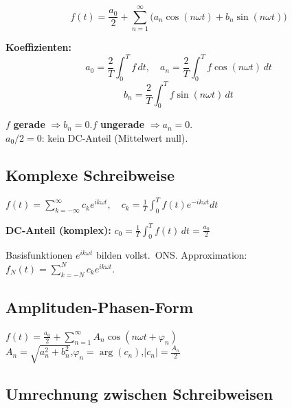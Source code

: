 \documentclass[10pt,a4paper,twocolumn]{article}
\newcommand{\detail}[1]{{\small\color{detail}#1}}
\begin{document}
	\begin{tcolorbox}[defbox, title={Formel}]
		$$f(t)=\frac{a_0}{2}+\sum_{n=1}^\infty\bigl(a_n\cos(n\omega t)+b_n\sin(n\omega t)\bigr)$$
	\end{tcolorbox}
	
	\textbf{Koeffizienten:}
	$$a_0=\frac{2}{T}\int_0^T\!f\,dt, \quad a_n=\frac{2}{T}\int_0^T\!f\cos(n\omega t)\,dt$$
	$$b_n=\frac{2}{T}\int_0^T\!f\sin(n\omega t)\,dt$$
	
	\begin{tcolorbox}[tipbox]
		$f$ \textbf{gerade} $\Rightarrow b_n=0$.\quad $f$ \textbf{ungerade} $\Rightarrow a_n=0$.\\
		$a_0/2=0$: kein DC-Anteil (Mittelwert null).
	\end{tcolorbox}
	
	\subsection{Komplexe Schreibweise}
	
	\begin{tcolorbox}[defbox, title={Formel}]
		$f(t)=\sum_{k=-\infty}^{\infty}c_k e^{ik\omega t},\quad c_k=\frac{1}{T}\int_0^T\!f(t)e^{-ik\omega t}dt$
	\end{tcolorbox}
	
	\begin{tcolorbox}[tipbox]
		\textbf{DC-Anteil (komplex):} $c_0 = \frac{1}{T}\int_0^T f(t)\,dt = \frac{a_0}{2}$
	\end{tcolorbox}
	
	\detail{Basisfunktionen $e^{ik\omega t}$ bilden vollst.\ ONS. Approximation: $f_N(t)=\sum_{k=-N}^N c_k e^{ik\omega t}$.}
	
	\subsection{Amplituden-Phasen-Form}
	
	\begin{tcolorbox}[defbox, title={Formel}]
		$f(t)=\frac{a_0}{2}+\sum_{n=1}^\infty A_n\cos(n\omega t+\varphi_n)$\\
		$A_n=\sqrt{a_n^2+b_n^2}$,\quad $\varphi_n=\arg(c_n)$,\quad $|c_n|=\frac{A_n}{2}$
	\end{tcolorbox}
	
	\subsection{Umrechnung zwischen Schreibweisen}
	
\end{document}
